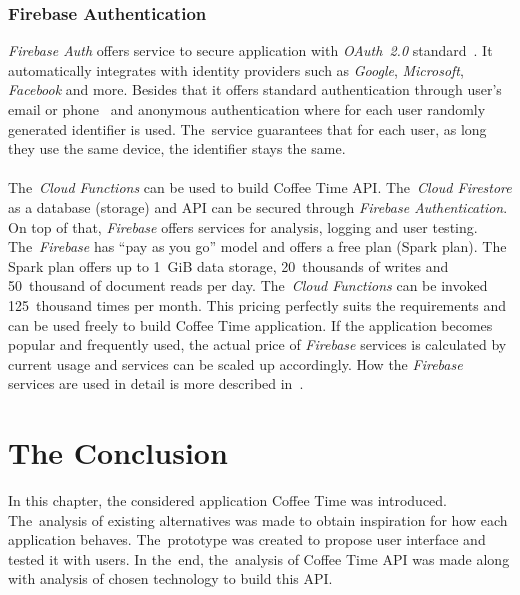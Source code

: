 \subsubsection{Firebase Authentication}
\textit{Firebase Auth} offers service to secure application with \textit{OAuth~2.0} standard~\cite{oauth}. It automatically integrates with identity providers such as \textit{Google}, \textit{Microsoft}, \textit{Facebook} and more. Besides that it offers standard authentication through user's email or phone~\cite{cloud-auth} and anonymous authentication where for each user randomly generated identifier is used. The~service guarantees that for each user, as long they use the same device, the identifier stays the same. 
\\
\\
The~\textit{Cloud Functions} can be used to build Coffee Time API. The~\textit{Cloud Firestore} as a database (storage) and API can be secured through \textit{Firebase Authentication}. On top of that, \textit{Firebase} offers services for analysis, logging and user testing. The~\textit{Firebase} has ``pay as you go'' model and offers a free plan (Spark plan). The Spark plan offers up to 1~GiB data storage, 20~thousands of writes and 50~thousand of document reads per day. The~\textit{Cloud Functions} can be invoked 125~thousand times per month. This pricing perfectly suits the requirements and can be used freely to build Coffee Time application. If the application becomes popular and frequently used, the actual price of \textit{Firebase} services is calculated by current usage and services can be scaled up accordingly. How the \textit{Firebase} services are used in detail is more described in~. 

\section{The Conclusion}
In this chapter, the considered application Coffee Time was introduced.\\ The~analysis of existing alternatives was made to obtain inspiration for how each application behaves. The~prototype was created to propose user interface and tested it with users. In the~end, the~analysis of Coffee Time API was made along with analysis of chosen technology to build this API.